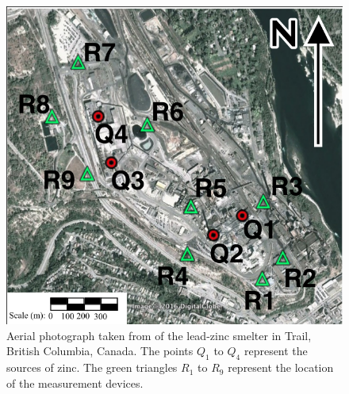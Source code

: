 \documentclass{sfuthesis}
\begin{document}
\begin{figure}[H]
\centering
\includegraphics[scale=0.35]{FigChap4/AerealView}
\caption{Aerial photograph taken from \cite{hosseini2016airborne} of the lead-zinc smelter in Trail, British Columbia, Canada. The points
$Q_{1}$ to $Q_{4}$ represent the sources of zinc. The green triangles $R_{1}$ to $R_{9}$ represent
the location of the measurement devices. }
\label{figAereal}
\end{figure}

\end{document}
